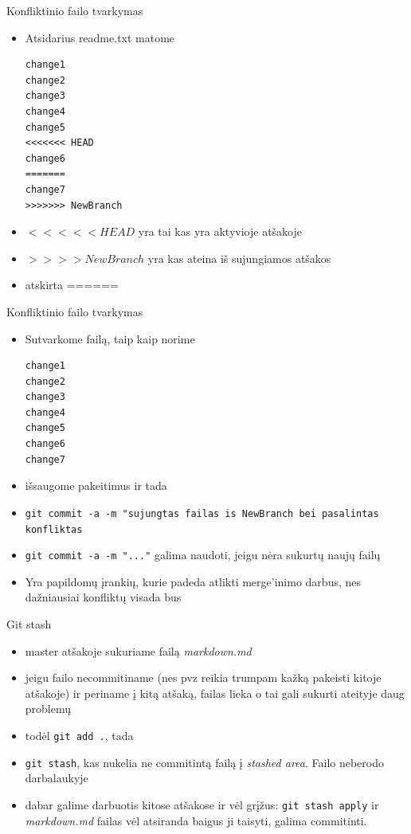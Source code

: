 \documentclass[11pt,xcolor=table]{beamer}
\begin{document}
\begin{frame}[fragile]{Konfliktinio failo tvarkymas}
\begin{itemize}
\item Atsidarius readme.txt matome

\begin{lstlisting}
change1
change2
change3
change4
change5
<<<<<<< HEAD
change6
=======
change7
>>>>>>> NewBranch
\end{lstlisting}
\item $<<<<<HEAD$ yra tai kas yra aktyvioje atšakoje
\item $>>>>NewBranch$ yra kas ateina iš sujungiamos atšakos
\item atskirta ======
\end{itemize}
\end{frame}


\begin{frame}[fragile]{Konfliktinio failo tvarkymas}
\begin{itemize}
\item Sutvarkome failą, taip kaip norime
\begin{lstlisting}
change1
change2
change3
change4
change5
change6
change7
\end{lstlisting}
\item išsaugome pakeitimus ir tada 
\item \colorbox{listinggray}{\lstinline|git commit -a -m "sujungtas failas is NewBranch bei pasalintas konfliktas|}
\item  \colorbox{listinggray}{\lstinline|git commit -a -m "..."|} galima naudoti, jeigu nėra sukurtų naujų failų
\item Yra papildomų įrankių, kurie padeda atlikti merge'inimo darbus, nes dažniausiai konfliktų visada bus
\end{itemize}
\end{frame}

\begin{frame}[fragile]{Git stash}
\begin{itemize}
\item master atšakoje sukuriame failą \textit{markdown.md} 
\item jeigu failo necommitiname (nes pvz reikia trumpam kažką pakeisti kitoje atšakoje) ir periname į kitą atšaką, failas lieka o tai gali sukurti ateityje daug problemų
\item todėl \colorbox{listinggray}{\lstinline|git add .|}, tada
\item \colorbox{listinggray}{\lstinline|git stash|}, kas nukelia ne commitintą failą į \textit{stashed area}. Failo neberodo darbalaukyje
\item dabar galime darbuotis kitose atšakose ir vėl grįžus: \colorbox{listinggray}{\lstinline|git stash apply|} ir \textit{markdown.md} failas vėl atsiranda baigus ji taisyti, galima commitinti.
\end{itemize}
\end{frame}
\end{document}
